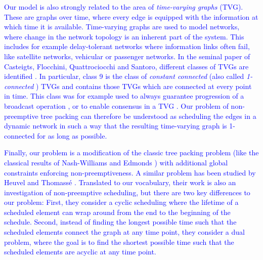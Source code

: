 \documentclass[runningheads]{llncs}
\newcommand{\lasse}[1]{\textcolor{blue}{#1}}
\begin{document}
\lasse{Our model is also strongly related to the area of \emph{time-varying graphs} (TVG). These are graphs over time, where every edge is equipped with the information at which time it is available.
Time-varying graphs are used to model networks, where change in the network topology is an inherent part of the system. 
This includes for example delay-tolerant networks where information links often fail, like satellite networks, vehicular or passenger networks.
 In the seminal paper of Casteigts, Flocchini, Quattrociocchi and Santoro, different classes of TVGs are identified \cite{time-varying-graphs}. 
 In particular, class 9 is the class of \emph{constant connected} (also called \emph{1-connected} \cite{B-connected-1}) TVGs and contains those TVGs which are connected at every point in time. 
 This class was for example used to always guarantee progression of a broadcast operation \cite{o2005information}, or to enable consensus in a TVG \cite{kuhn2011coordinated}. Our problem of non-preemptive tree packing can therefore be understood as scheduling the edges in a dynamic network in such a way that the resulting time-varying graph is 1-connected 
 for as long as possible.}
 
 \lasse{
Finally, our problem is a modification of the classic tree packing problem (like the classical results of Nash-Williams \cite{Nash-Williams1961} and Edmonds \cite{edmonds1965minimum}) with additional global constraints enforcing non-preemptiveness. 
A similar problem has been studied by Heuvel and Thomassé \cite{van2012cyclic}.
 Translated to our vocabulary, their work is also an investigation of non-preemptive scheduling, but there are two key differences to our problem: First, they consider a cyclic scheduling where the lifetime of a scheduled element can wrap around from the end to the beginning of the schedule.
  Second, instead of finding the longest possible time such that the scheduled elements connect the graph at any time point, they consider a dual problem, where the goal is to find the shortest possible time such that the scheduled elements are acyclic at any time point. 
}
\end{document}
